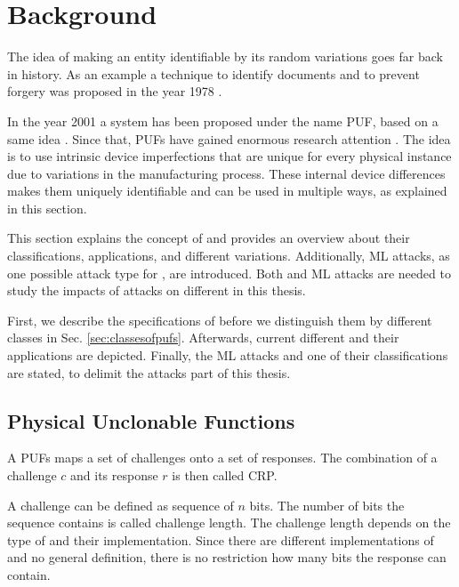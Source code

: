 \chapter{Background}
\label{cap:background}

The idea of making an entity identifiable by its random variations goes far back in history.
As an example a technique to identify documents and to prevent forgery was proposed in the year 1978 \cite{Brosow1980MethodForgery}.%

In the year 2001 a system has been proposed under the name \acf{PUF}, based on a same idea \cite{Pappu2001PhysicalFunctions}.
Since that, \acp{PUF} have gained enormous research attention \cite{Becker2015ThePUFs}. %
The idea is to use intrinsic device imperfections that are unique for every physical instance due to variations in the manufacturing process.
These internal device differences makes them uniquely identifiable and can be used in multiple ways, as explained in this section.

This section explains the concept of \pufs and provides an overview about their classifications, applications, and different variations.
Additionally, \ac{ML} attacks, as one possible attack type for \pufs, are introduced.
Both \pufs and \ac{ML} attacks are needed to study the impacts of attacks on different \pufs in this thesis. %

First, we describe the specifications of \pufs before we distinguish them by different classes in Sec. \ref{sec:classesofpufs}.
Afterwards, current different \pufs and their applications are depicted.
Finally, the \ac{ML} attacks and one of their classifications are stated, to delimit the attacks part of this thesis.


\section{Physical Unclonable Functions}
\label{sec:pyhsicalunclonablefunctions}

A \acfp{PUF} maps a set of challenges onto a set of responses.
The combination of a challenge $c$ and its response $r$ is then called \ac{CRP}. %

A challenge can be defined as sequence of $n$ bits.
The number of bits the sequence contains is called challenge length. %
The challenge length depends on the type of \puf and their implementation.
Since there are different implementations of \pufs and no general definition, there is no restriction how many bits the response can contain. %

